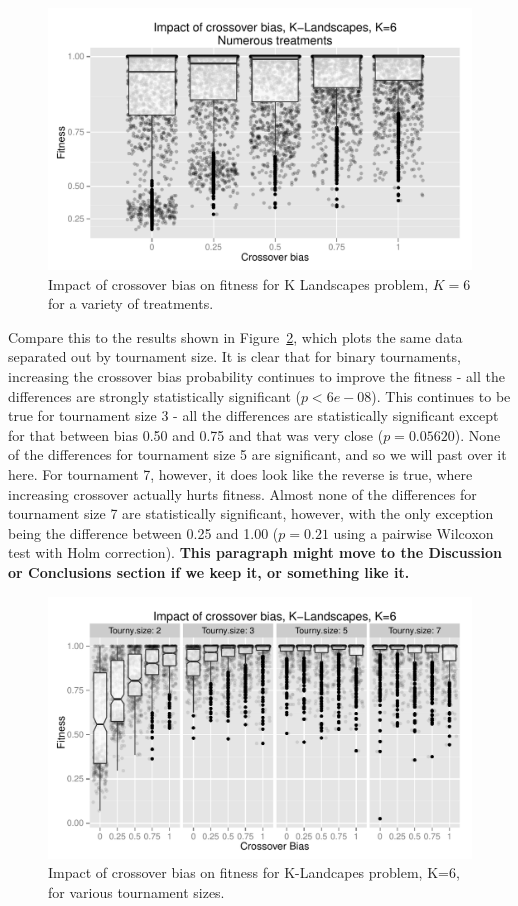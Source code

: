 \documentclass{sig-alternate}
\begin{document}
\begin{figure}
\centering
\includegraphics[width=0.45 \textwidth]{Plots/KLandscapes6_XO_bias_impact_transformed_boxplot_alpha075.pdf}
\caption{Impact of crossover bias on fitness for K Landscapes problem, $K=6$ for a variety of treatments.}
\label{fig:KLandscapes6_results}
\end{figure}

Compare this to the results shown in Figure~\ref{fig:KLandscapes6_XO_bias_impact_facets}, which plots the same data
separated out by tournament size. It is clear that for binary tournaments, increasing the crossover bias probability
continues to improve the fitness - all the differences are strongly statistically significant ($p<6e-08$). This
continues to be true for tournament size 3 - all the differences are statistically significant except for that between
bias 0.50 and 0.75 and that was very close ($p=0.05620$). None of the differences for tournament size 5 are
significant, and so we will past over it here. For tournament 7, however, it does look like the reverse is true, where
increasing crossover actually hurts fitness. Almost none of the differences for tournament size 7 are statistically
significant, however, with the only exception being the difference between 0.25 and 1.00 ($p=0.21$ using a pairwise
Wilcoxon test with Holm correction). \textbf{This paragraph might move to the Discussion or Conclusions section if we
keep it, or something like it.}

\begin{figure}
\centering
\includegraphics[width=0.45 \textwidth]{Plots/KLandscapes6_XO_bias_impact_facets.pdf}
\caption{Impact of crossover bias on fitness for K-Landcapes problem, K=6, for various tournament sizes.}
\label{fig:KLandscapes6_XO_bias_impact_facets}
\end{figure}
\end{document}
